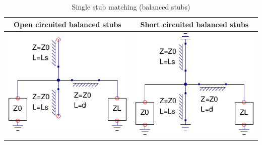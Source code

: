 \begin{table}[H]
  \centering
  \begin{tabular}{ | c | c | }
    \hline
    Open circuited balanced stubs & Short circuited balanced stubs\\ \hline
    \begin{minipage}{.4\textwidth}
      \includegraphics[width=\linewidth]{SingleStubOpenBalanced}
    \end{minipage}
    &
    \begin{minipage}{.4\textwidth}
      \includegraphics[width=\linewidth]{SingleStubShortBalanced}
    \end{minipage}
    \\ \hline
  \end{tabular}
  \caption{Single stub matching (balanced stubs)}\label{tbl:sngstubbalanced}
\end{table}

